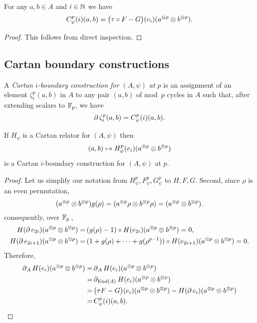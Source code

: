 \begin{lemma}
	For any $a,b \in A$ and $i \in \mathbb{N}$ we have
	\[
	C^p_\psi(i)(a,b) =
	\big(\tau \mathbin{\circ} F - G\big)(e_i)(a^{\otimes p} \otimes b^{\otimes p}).
	\]
\end{lemma}

\begin{proof}
	This follows from direct inspection.
\end{proof}

\subsection{Cartan boundary constructions}\label{ss:cartan_coboundary}

A \textit{Cartan $i$-boundary construction for $(A,\psi)$ at $p$} is an assignment of an element $\zeta_i^p(a,b)$ in $A$ to any pair $(a,b)$ of mod~$p$ cycles in $A$ such that, after extending scalars to ${\mathbb{F}_p}$, we have
\[
\operatorname{\partial} \zeta_i^p(a,b) = C_\psi^p(i)(a, b).
\]

\begin{theorem}
	If $H_\psi$ is a Cartan relator for $(A, \psi)$ then
	\[
	(a,b) \mapsto H_\psi^p(e_i)(a^{\otimes p} \otimes b^{\otimes p})
	\]
	is a Cartan $i$-boundary construction for $(A, \psi)$ at $p$.
\end{theorem}

\begin{proof}
	Let us simplify our notation from $H_\psi^p, F_\psi^p, G_\psi^p$ to $H, F, G$.
	Second, since $\rho$ is an even permutation,
	\[
	(a^{\otimes p} \otimes b^{\otimes p}) g(\rho) = (a^{\otimes p} \rho \otimes b^{\otimes p} \rho ) = (a^{\otimes p} \otimes b^{\otimes p}).
	\]
	consequently, over ${\mathbb{F}_p}$\,,
	\begin{align*}
		H(\operatorname{\partial} e_{2i})(a^{\otimes p} \otimes b^{\otimes p}) =&\,
		(g(\rho) - 1) \mathbin{\circ} H(e_{2i})(a^{\otimes p} \otimes b^{\otimes p}) = 0, \\
		H(\operatorname{\partial} e_{2i+1})(a^{\otimes p} \otimes b^{\otimes p}) =&\,
		(1+g(\rho)+\dots+g(\rho^{p-1})) \mathbin{\circ} H(e_{2i+1})(a^{\otimes p} \otimes b^{\otimes p}) = 0.
	\end{align*}
	Therefore,
	\begin{align*}
		\operatorname{\partial}_A H(e_i)(a^{\otimes p} \otimes b^{\otimes p}) =&
		\operatorname{\partial}_A H(e_i)(a^{\otimes p} \otimes b^{\otimes p}) \\ =&
		\operatorname{\partial}_{\mathrm{End}(A)} H(e_i)(a^{\otimes p} \otimes b^{\otimes p}) \\ =& \,
		\big(\tau F - G\big)(e_i)(a^{\otimes p} \otimes b^{\otimes p}) -
		H(\operatorname{\partial} e_i)(a^{\otimes p} \otimes b^{\otimes p}) \\ =&\,
		C^p_\psi(i)(a,b).\qedhere
	\end{align*}
\end{proof}